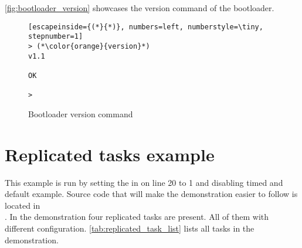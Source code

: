 \autoref{fig:bootloader_version} showcases the version command of the bootloader.

\begin{figure}[H]
\begin{changemargin}{1cm}{1cm}
\begin{lstlisting}[escapeinside={(*}{*)}, numbers=left, numberstyle=\tiny, stepnumber=1]
> (*\color{orange}{version}*)
v1.1

OK

>  
\end{lstlisting}  
\end{changemargin}
\caption{Bootloader version command}
\label{fig:bootloader_version}
\end{figure}

\section{Replicated tasks example}

This example is run by setting the  in  on line 20 to 1 and disabling timed and default example. Source code that will make the demonstration easier to follow is located in \\. In the demonstration four replicated tasks are present. All of them with different configuration. \autoref{tab:replicated_task_list} lists all tasks in the demonstration.

\begin{table}[H]
\centering
{}
\caption{All replicated tasks in demonstration}
\label{tab:replicated_task_list}
\end{table}

